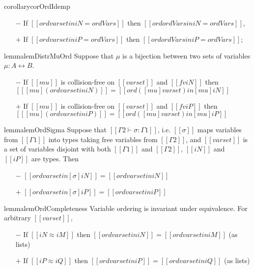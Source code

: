 \begin{restatable}{corollary}{corOrdIdemp}
  \label{corollary:ord-idemp}
  \hfill
  \begin{itemize}
    \item[$-$] If $[[ ord varset in iN = ordVars ]]$ then 
      $[[ ord {ordVars} in iN = ordVars ]]$,
    \item[$+$] If $[[ ord varset in iP = ordVars ]]$ then 
      $[[ ord {ordVars} in iP = ordVars ]]$;
  \end{itemize}
\end{restatable}

\begin{restatable}{lemma}{lemDistrMuOrd}
  \label{lemma:distr-mu-ord}
  Suppose that $\mu$ is a bijection between two sets of variables
  $\mu : A \leftrightarrow B$.
  \begin{itemize}
  \item[$-$]
    If $[[mu]]$ is collision-free on $[[varset]]$ and $[[fv iN]]$ then
    $[[ [mu] (ord varset in iN) ]] = [[ord ([mu] varset) in [mu] iN ]]$
  \item[$+$]
    If $[[mu]]$ is collision-free on $[[varset]]$ and $[[fv iP]]$ then
    $[[ [mu] (ord varset in iP) ]] = [[ord ([mu] varset) in [mu] iP ]]$
  \end{itemize}
\end{restatable}

\begin{restatable}{lemma}{lemOrdSigma}
    \label{lemma:ord-sigma}
    Suppose that $[[Γ2 ⊢ σ : Γ1]]$, i.e. $[[σ]]$ maps variables from $[[Γ1]]$ into types
    taking free variables from $[[Γ2]]$, and $[[varset]]$ is a set of variables
    disjoint with both $[[Γ1]]$ and $[[Γ2]]$, 
    $[[iN]]$ and $[[iP]]$ are types. Then
        \begin{itemize}
    \item[$-$] $[[ ord varset in [σ]iN ]] = [[ord varset in iN ]]$
    \item[$+$] $[[ ord varset in [σ]iP ]] = [[ord varset in iP ]]$
    \end{itemize}
\end{restatable}

\begin{restatable}{lemma}{lemOrdCompleteness}
    \label{lemma:ord-completeness}
    Variable ordering is invariant under equivalence. For arbitrary $[[varset]]$,
     \begin{itemize}
    \item[$-$] If $[[iN ≈ iM]]$ then $[[ord varset in iN]] = [[ord varset in iM]]$ (as lists)
    \item[$+$] If $[[iP ≈ iQ]]$ then $[[ord varset in iP]] = [[ord varset in iQ]]$ (as lists)
    \end{itemize}
\end{restatable}
